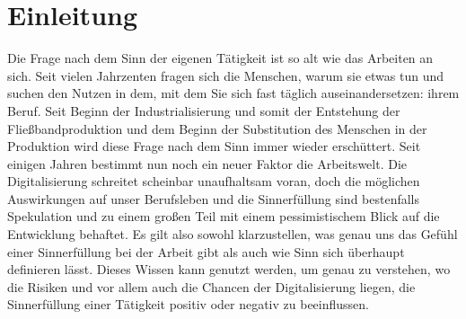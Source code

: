 \chapter{Einleitung}
Die Frage nach dem Sinn der eigenen Tätigkeit ist so alt wie das Arbeiten an sich. Seit vielen Jahrzenten fragen sich die Menschen, warum sie etwas tun und suchen den Nutzen in dem, mit dem Sie sich fast täglich auseinandersetzen: ihrem Beruf. Seit Beginn der Industrialisierung und somit der Entstehung der Fließbandproduktion und dem Beginn der Substitution des Menschen in der Produktion wird diese Frage nach dem Sinn immer wieder erschüttert. Seit einigen Jahren bestimmt nun noch ein neuer Faktor die Arbeitswelt. Die Digitalisierung schreitet scheinbar unaufhaltsam voran, doch die möglichen Auswirkungen auf unser Berufsleben und die Sinnerfüllung sind bestenfalls Spekulation und zu einem großen Teil mit einem pessimistischem Blick auf die Entwicklung behaftet. Es gilt also sowohl klarzustellen, was genau uns das Gefühl einer Sinnerfüllung bei der Arbeit gibt als auch wie Sinn sich überhaupt definieren lässt. Dieses Wissen kann genutzt werden, um genau zu verstehen, wo die Risiken und vor allem auch die Chancen der Digitalisierung liegen, die Sinnerfüllung einer Tätigkeit positiv oder negativ zu beeinflussen.